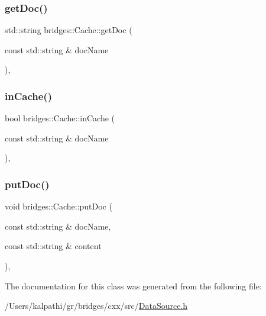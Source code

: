 \subsubsection{\texorpdfstring{getDoc()}{getDoc()}}
{\footnotesize\ttfamily std\+::string bridges\+::\+Cache\+::get\+Doc (\begin{DoxyParamCaption}\item[{const std\+::string \&}]{doc\+Name }\end{DoxyParamCaption})\hspace{0.3cm}{\ttfamily [inline]}, {\ttfamily [noexcept]}}

\mbox{\label{classbridges_1_1_cache_a47b9bd1b61a90f2844b4220337dd10fe}} 
\subsubsection{\texorpdfstring{inCache()}{inCache()}}
{\footnotesize\ttfamily bool bridges\+::\+Cache\+::in\+Cache (\begin{DoxyParamCaption}\item[{const std\+::string \&}]{doc\+Name }\end{DoxyParamCaption})\hspace{0.3cm}{\ttfamily [inline]}, {\ttfamily [noexcept]}}

\mbox{\label{classbridges_1_1_cache_ac289170b26980f80e6789f40561b5a95}} 
\subsubsection{\texorpdfstring{putDoc()}{putDoc()}}
{\footnotesize\ttfamily void bridges\+::\+Cache\+::put\+Doc (\begin{DoxyParamCaption}\item[{const std\+::string \&}]{doc\+Name,  }\item[{const std\+::string \&}]{content }\end{DoxyParamCaption})\hspace{0.3cm}{\ttfamily [inline]}, {\ttfamily [noexcept]}}



The documentation for this class was generated from the following file\+:\begin{DoxyCompactItemize}
\item 
/\+Users/kalpathi/gr/bridges/cxx/src/\mbox{\hyperlink{_data_source_8h}{Data\+Source.\+h}}\end{DoxyCompactItemize}
